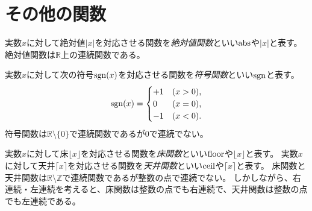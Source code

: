 \section{その他の関数}

実数$x$に対して絶対値$|x|$を対応させる関数を\emph{絶対値関数}といい$\operatorname{abs}$や$|x|$と表す。
絶対値関数は$\mathbb{R}$上の連続関数である。

実数$x$に対して次の符号$\operatorname{sgn}(x)$を対応させる関数を\emph{符号関数}といい$\operatorname{sgn}$と表す。
$$
\operatorname{sgn}(x) =
\begin{cases}
+1 & \text{($x > 0$),} \\
0 & \text{($x = 0$),} \\
-1 & \text{($x < 0$).} \\
\end{cases}
$$
符号関数は$\mathbb{R}\setminus\{ 0 \}$で連続関数であるが$0$で連続でない。

実数$x$に対して床$\lfloor x \rfloor$を対応させる関数を\emph{床関数}といい$\operatorname{floor}$や$\lfloor x \rfloor$と表す。
実数$x$に対して天井$\lceil x \rceil$を対応させる関数を\emph{天井関数}といい$\operatorname{ceil}$や$\lceil x \rceil$と表す。
床関数と天井関数は$\mathbb{R}\setminus\mathbb{Z}$で連続関数であるが整数の点で連続でない。
しかしながら、右連続・左連続を考えると、床関数は整数の点でも右連続で、天井関数は整数の点でも左連続である。
